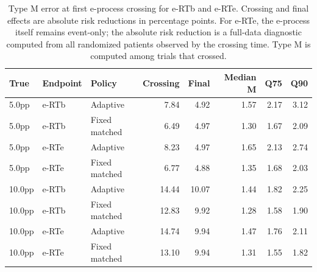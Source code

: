 \begin{table}[htbp]
\centering
\small
\caption{Type M error at first e-process crossing for e-RTb and e-RTe. Crossing and final effects are absolute risk reductions in percentage points. For e-RTe, the e-process itself remains event-only; the absolute risk reduction is a full-data diagnostic computed from all randomized patients observed by the crossing time. Type M is computed among trials that crossed.}
\begin{tabular}{@{}lllrrrrr@{}}
\toprule
True & Endpoint & Policy & Crossing & Final & Median M & Q75 & Q90 \\
\midrule
5.0pp & e-RTb & Adaptive & 7.84 & 4.92 & 1.57 & 2.17 & 3.12 \\
5.0pp & e-RTb & Fixed matched & 6.49 & 4.97 & 1.30 & 1.67 & 2.09 \\
5.0pp & e-RTe & Adaptive & 8.23 & 4.97 & 1.65 & 2.13 & 2.74 \\
5.0pp & e-RTe & Fixed matched & 6.77 & 4.88 & 1.35 & 1.68 & 2.03 \\
10.0pp & e-RTb & Adaptive & 14.44 & 10.07 & 1.44 & 1.82 & 2.25 \\
10.0pp & e-RTb & Fixed matched & 12.83 & 9.92 & 1.28 & 1.58 & 1.90 \\
10.0pp & e-RTe & Adaptive & 14.74 & 9.94 & 1.47 & 1.76 & 2.11 \\
10.0pp & e-RTe & Fixed matched & 13.10 & 9.94 & 1.31 & 1.55 & 1.82 \\
\bottomrule
\end{tabular}
\label{tab:type_m_crossing}
\end{table}
